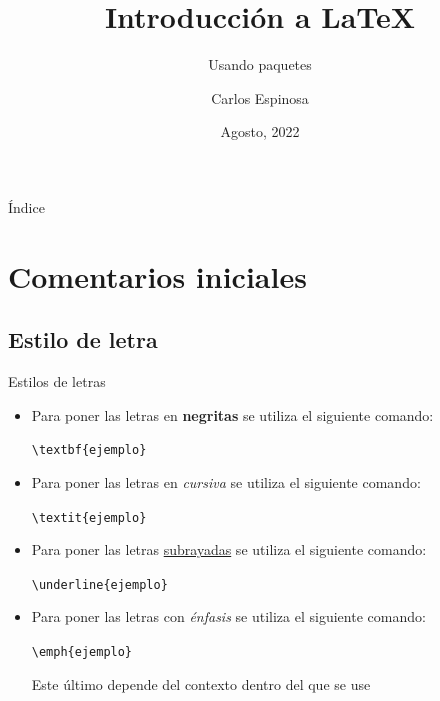 \documentclass[11pt]{beamer}
\institute{Facultad de Ciencias \\ Universidad Nacional Autónoma de México}
\title{Introducci\'on a \LaTeX}
\subtitle{Usando paquetes}
\author{Carlos Espinosa}
\date{Agosto, 2022}
\begin{document}
	\begin{frame}{}
		\titlepage
	\end{frame}

	\begin{frame}{Índice}
		\tableofcontents
	\end{frame}

	\section{Comentarios iniciales}
	\subsection{Estilo de letra}
	\begin{frame}[containsverbatim]{Estilos de letras}
		\begin{itemize}
			\item Para poner las letras en \textbf{negritas} se utiliza el siguiente comando:
			
			\lstinline!\textbf{ejemplo}!
			
			\item Para poner las letras en \textit{cursiva} se utiliza el siguiente comando:
			
			\lstinline!\textit{ejemplo}!
			
			\item Para poner las letras \underline{subrayadas} se utiliza el siguiente comando:
			
			\lstinline!\underline{ejemplo}!
			
			\item Para poner las letras con \emph{énfasis} se utiliza el siguiente comando:
			
			\lstinline!\emph{ejemplo}!
			
			Este último depende del contexto dentro del que se use
		\end{itemize}
\end{frame}
\end{document}
